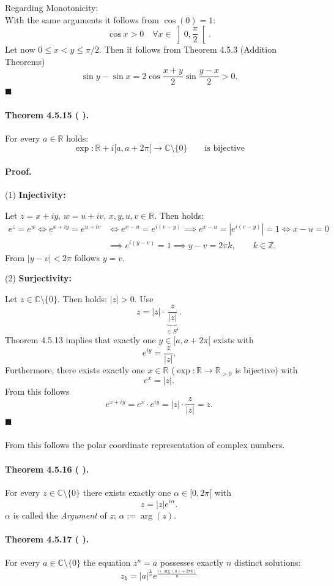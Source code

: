 \documentclass[12pt]{article}
\newcommand{\Z}{\mathbb{Z}}
\newcommand{\R}{\mathbb{R}}
\newcommand{\C}{\mathbb{C}}
\newcommand{\NumberedTheorem}[3]{%
\paragraph*{Theorem #1 ( #2 ).} #3\par}
\begin{document}
Regarding Monotonicity: \\
With the same arguments it follows from $\cos(0) = 1$:
\[
\cos x > 0 \quad \forall x \in \left]0, \frac{\pi}{2}\right[.
\]
Let now $0 \le x < y \le \pi/2$. Then it follows from Theorem 4.5.3 (Addition Theorems)
\[
\sin y - \sin x = 2 \cos \frac{x+y}{2} \sin \frac{y-x}{2} > 0.
\]
\hfill $\blacksquare$

\NumberedTheorem{4.5.15}{}{For every $a \in \R$ holds:
\[
\exp : \R + i[a, a + 2\pi[ \to \C \setminus \{0\} \qquad \text{is bijective}
\]
}

\paragraph*{Proof.}

(1) \textbf{Injectivity:}
\par\medskip
Let $z = x + iy, \, w = u + iv, \, x, y, u, v \in \R$. Then holds:
\begin{align*}
e^z = e^w \iff e^{x+iy} = e^{u+iv} &\iff e^{x-u} = e^{i(v-y)} \implies e^{x-u} = |e^{i(v-y)}| = 1 \iff x - u = 0 \\
&\implies e^{i(y-v)} = 1 \implies y - v = 2\pi k, \qquad k \in \Z.
\end{align*}
From $|y - v| < 2\pi$ follows $y = v$.

(2) \textbf{Surjectivity:}
\par\medskip
Let $z \in \C \setminus \{0\}$. Then holds: $|z| > 0$. Use
\[
z = |z| \cdot \underbrace{\frac{z}{|z|}}_{\in S^1}.
\]
Theorem 4.5.13 implies that exactly one $y \in [a, a + 2\pi[$ exists with
\[
e^{iy} = \frac{z}{|z|}.
\]
Furthermore, there exists exactly one $x \in \R$ ($\exp : \R \to \R_{>0}$ is bijective) with
\[
e^x = |z|.
\]
From this follows
\[
e^{x+iy} = e^x \cdot e^{iy} = |z| \cdot \frac{z}{|z|} = z.
\]
\hfill $\blacksquare$

\paragraph*{}
From this follows the polar coordinate representation of complex numbers.

\NumberedTheorem{4.5.16}{}{For every $z \in \C \setminus \{0\}$ there exists exactly one $\alpha \in [0, 2\pi[$ with
\[
z = |z|e^{i\alpha}.
\]
$\alpha$ is called the \textit{Argument} of $z$; $\alpha := \arg(z)$.}

\NumberedTheorem{4.5.17}{}{For every $a \in \C \setminus \{0\}$ the equation $z^n = a$ possesses exactly $n$ distinct solutions:
\[
z_k = |a|^{\frac{1}{n}} e^{\frac{i(\arg(a)+2\pi k)}{n}}
\]
}
\end{document}
